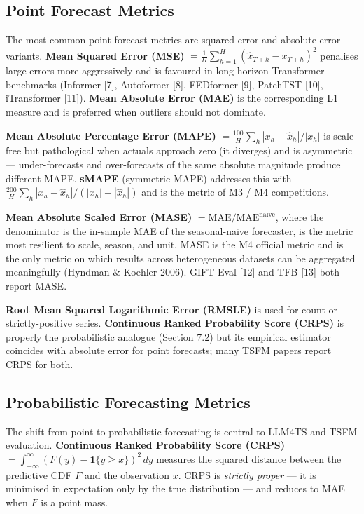 \subsection{Point Forecast Metrics}\label{point-forecast-metrics}

The most common point-forecast metrics are squared-error and absolute-error variants. \textbf{Mean Squared Error (MSE)} \(= \frac{1}{H} \sum_{h=1}^H (\hat{x}_{T+h} - x_{T+h})^2\) penalises large errors more aggressively and is favoured in long-horizon Transformer benchmarks (Informer {[}7{]}, Autoformer {[}8{]}, FEDformer {[}9{]}, PatchTST {[}10{]}, iTransformer {[}11{]}). \textbf{Mean Absolute Error (MAE)} is the corresponding L1 measure and is preferred when outliers should not dominate.

\textbf{Mean Absolute Percentage Error (MAPE)} \(= \frac{100}{H} \sum_h |x_h - \hat{x}_h| / |x_h|\) is scale-free but pathological when actuals approach zero (it diverges) and is asymmetric --- under-forecasts and over-forecasts of the same absolute magnitude produce different MAPE. \textbf{sMAPE} (symmetric MAPE) addresses this with \(\frac{200}{H}\sum_h |x_h - \hat{x}_h|/(|x_h|+|\hat{x}_h|)\) and is the metric of M3 / M4 competitions.

\textbf{Mean Absolute Scaled Error (MASE)} \(= \mathrm{MAE} / \mathrm{MAE}^{\mathrm{naive}}\), where the denominator is the in-sample MAE of the seasonal-naive forecaster, is the metric most resilient to scale, season, and unit. MASE is the M4 official metric and is the only metric on which results across heterogeneous datasets can be aggregated meaningfully (Hyndman \& Koehler 2006). GIFT-Eval {[}12{]} and TFB {[}13{]} both report MASE.

\textbf{Root Mean Squared Logarithmic Error (RMSLE)} is used for count or strictly-positive series. \textbf{Continuous Ranked Probability Score (CRPS)} is properly the probabilistic analogue (Section 7.2) but its empirical estimator coincides with absolute error for point forecasts; many TSFM papers report CRPS for both.

\subsection{Probabilistic Forecasting Metrics}\label{probabilistic-forecasting-metrics}

The shift from point to probabilistic forecasting is central to LLM4TS and TSFM evaluation. \textbf{Continuous Ranked Probability Score (CRPS)} \(= \int_{-\infty}^{\infty} (F(y) - \mathbf{1}\{y \geq x\})^2\, dy\) measures the squared distance between the predictive CDF \(F\) and the observation \(x\). CRPS is \emph{strictly proper} --- it is minimised in expectation only by the true distribution --- and reduces to MAE when \(F\) is a point mass.

